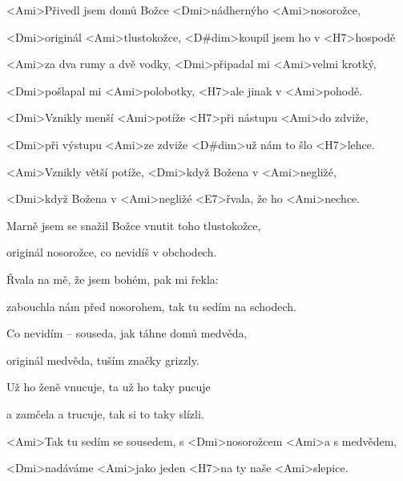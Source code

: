

\zs
<Ami>Přivedl jsem domů Božce <Dmi>nádhernýho <Ami>nosorožce,

<Dmi>originál <Ami>tlustokožce, <D#dim>koupil jsem ho 
v <H7>hospodě

<Ami>za dva rumy a dvě vodky, <Dmi>připadal mi <Ami>velmi 
krotký,

<Dmi>pošlapal mi <Ami>polobotky, <H7>ale jinak v <Ami>pohodě.

<Dmi>Vznikly menší <Ami>potíže <H7>při nástupu <Ami>do zdviže,

<Dmi>při výstupu <Ami>ze zdviže <D#dim>už nám to šlo <H7>lehce.

<Ami>Vznikly větší potíže, <Dmi>když Božena v <Ami>negližé,

<Dmi>když Božena v <Ami>negližé <E7>řvala, že ho <Ami>nechce.
\ks

\zs
Marně jsem se snažil Božce vnutit toho tlustokožce,

originál nosorožce, co nevidíš v obchodech.

Řvala na mě, že jsem bohém, pak mi řekla: 

zabouchla nám před nosorohem, tak tu sedím na schodech.

Co nevidím -- souseda, jak táhne domů medvěda,

originál medvěda, tuším značky grizzly.

Už ho ženě vnucuje, ta už ho taky pucuje

a zamčela a trucuje, tak si to taky slízli.
\ks

\zs
<Ami>Tak tu sedím se sousedem, s <Dmi>nosorožcem <Ami>a s medvědem,

<Dmi>nadáváme <Ami>jako jeden <H7>na ty naše <Ami>slepice.
\ks

\kp
